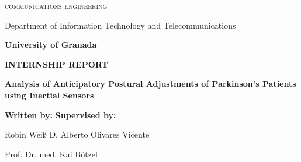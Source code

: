 \begin{titlepage}
\label{ch:titlepage}
\begin{center}

{\Large\textsc{communications engineering}}

Department of Information Technology and Telecommunications

\textbf{University of Granada}

\vspace{0.5cm}

\begin{figure}[h]
	\centering
	\label{fig:ugr}
\end{figure}

\vspace{0.5cm}
\textbf{INTERNSHIP REPORT}

\vspace{0.9cm}

{\Huge\textbf{Analysis of Anticipatory Postural Adjustments of Parkinson's Patients using Inertial Sensors}}

\end{center}

\vspace{1.5cm}
\textbf{Written by:}  \hfill \textbf{Supervised by:}

Robin Weiß \hfill D. Alberto Olivares Vicente

\hfill Prof. Dr. med. Kai B\"{o}tzel

\end{titlepage}
